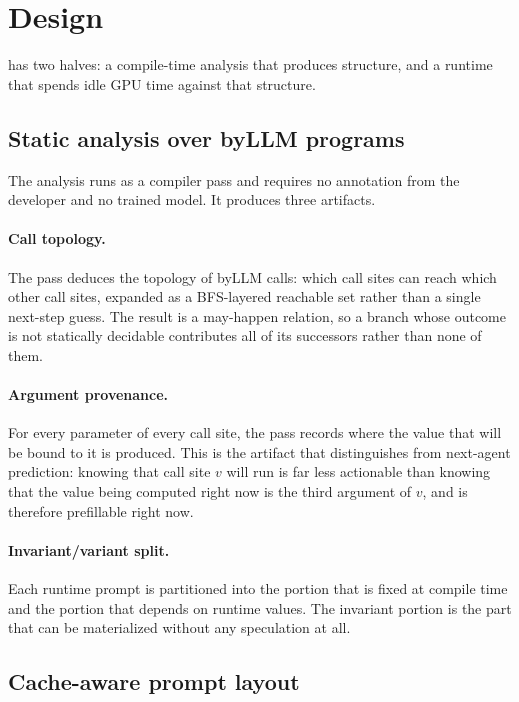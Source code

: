 \section{Design}
\label{sec:design}

\sysname{} has two halves: a compile-time analysis that produces structure, and a
runtime that spends idle GPU time against that structure.

\subsection{Static analysis over byLLM programs}

The analysis runs as a compiler pass and requires no annotation from the
developer and no trained model. It produces three artifacts.

\paragraph{Call topology.} The pass deduces the topology of byLLM calls: which
call sites can reach which other call sites, expanded as a BFS-layered reachable
set rather than a single next-step guess. The result is a may-happen relation, so
a branch whose outcome is not statically decidable contributes all of its
successors rather than none of them.

\paragraph{Argument provenance.} For every parameter of every call site, the pass
records where the value that will be bound to it is produced. This is the
artifact that distinguishes \sysname{} from next-agent prediction: knowing that
call site $v$ will run is far less actionable than knowing that the value being
computed right now is the third argument of $v$, and is therefore prefillable
right now.

\paragraph{Invariant/variant split.} Each runtime prompt is partitioned into the
portion that is fixed at compile time and the portion that depends on runtime
values. The invariant portion is the part that can be materialized without any
speculation at all.

\subsection{Cache-aware prompt layout}

